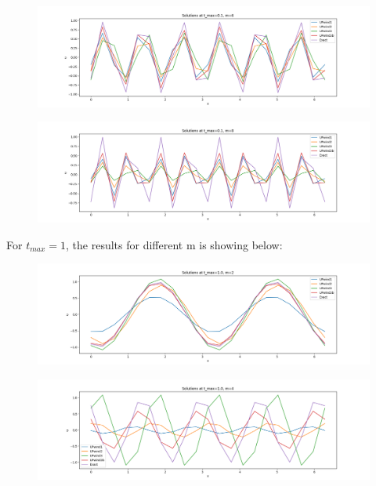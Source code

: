 \documentclass[12pt]{article}
\begin{document}
\begin{figure}[H]
    \centering
    \includegraphics[width=1\textwidth]{figures/t0.1m6.png}
    \label{IGs.jpg}
\end{figure}

\begin{figure}[H]
    \centering
    \includegraphics[width=1\textwidth]{figures/t0.1m8.png}
    \label{IGs.jpg}
\end{figure}


For $t_{max} = 1$, the results for different m is showing below:

\begin{figure}[H]
    \centering
    \includegraphics[width=1\textwidth]{figures/t1m2.png}
    \label{IGs.jpg}
\end{figure}

\begin{figure}[H]
    \centering
    \includegraphics[width=1\textwidth]{figures/t1m4.png}
    \label{IGs.jpg}
\end{figure}
\end{document}
